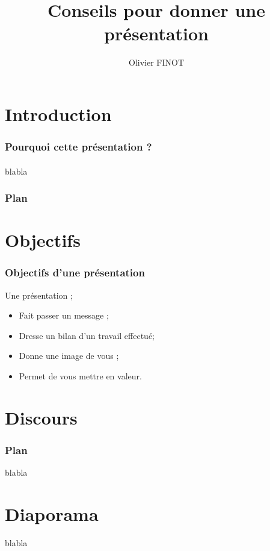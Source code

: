 \documentclass{beamer}
\title{Conseils pour donner une présentation}
\author{Olivier FINOT}\institute[]{Groupe Scolaire S$^t$ Vincent, S$^t$ Bernard}
\begin{document}
	
	
	
\begin{frame}
	\titlepage
\end{frame}

\section{Introduction}
\begin{frame}
	\frametitle{Pourquoi cette présentation ?}  
	\framesubtitle{}
	
	blabla
	
\end{frame}

\begin{frame}
	\frametitle{Plan}
	
	\tableofcontents
\end{frame}

\section{Objectifs}
\begin{frame}
	\frametitle{Objectifs d'une présentation}
	
	Une présentation ;
	
	\begin{itemize}
		\item Fait passer un message ;
		\item Dresse un bilan d'un travail effectué;
		\item Donne une image de vous ;
		\item Permet de vous mettre en valeur.
		
	\end{itemize}
	
\end{frame}

\section{Discours}
\begin{frame}
	\frametitle{Plan}
	blabla
	
\end{frame}


\section{Diaporama}
\begin{frame}

	blabla

\end{frame}
\end{document}
